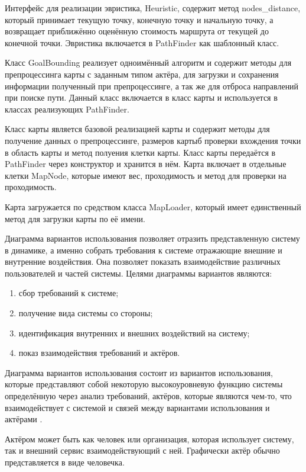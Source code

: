 
Интерфейс для реализации эвристика, Heuristic, содержит метод nodes\_distance, который принимает текущую точку, конечную точку и начальную точку, а возвращает приближённо оценённую стоимость маршрута от текущей до конечной точки. Эвристика включается в PathFinder как шаблонный класс.

Класс GoalBounding реализует одноимённый алгоритм и содержит методы для препроцессинга карты с заданным типом актёра, для загрузки и сохранения информации полученный при препроцессинге, а так же для отброса направлений при поиске пути. Данный класс включается в класс карты и используется в классах реализующих PathFinder.

Класс карты является базовой реализацией карты и содержит методы для получение данных о препроцессинге, размеров картыб проверки вхождения точки в область карты и метод полуения клетки карты. Класс карты передаётся в PathFinder через конструктор и хранится в нём. Карта включает в отдельные клетки MapNode, которые имеют вес, проходимость и метод для проверки на проходимость.

Карта загружается по средством класса MapLoader, который имеет единственный метод для загрузки карты по её имени.

Диаграмма вариантов использования позволяет отразить представленную систему в динамике, а именно собрать требования к системе отражающие внешние и внутренние воздействия. Она позволяет показать взаимодействие различных пользователей и частей системы. Целями диаграммы вариантов являются:

\begin{enumerate}
	\item сбор требований к системе;
	\item получение вида системы со стороны;
	\item идентификация внутренних и внешних воздействий на систему;
	\item показ взаимодействия требований и актёров.
\end{enumerate}

Диаграмма вариантов использования состоит из вариантов использования, которые представляют собой некоторую высокоуровневую функцию системы определённую через анализ требований, актёров, которые являются чем-то, что взаимодействует с системой и связей между вариантами использования и актёрами \cite{USE_CASE}.

Актёром может быть как человек или организация, которая использует систему, так и внешний сервис взаимодействующий с ней. Графически актёр обычно представляется в виде человечка.

